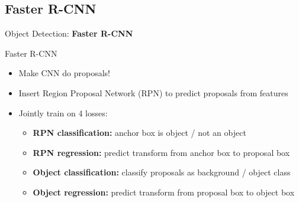 \subsection{Faster R-CNN}
\begin{frame}{}
    \LARGE Object Detection: \textbf{Faster R-CNN}
\end{frame}

\begin{frame}{Faster R-CNN}
    \begin{itemize}
        \item Make CNN do proposals!
        \item Insert Region Proposal Network (RPN) to predict proposals from features
        \pause
        \item Jointly train on 4 losses:
        \begin{itemize}
            \item \textbf{RPN classification:} anchor box is object / not an object
            \item \textbf{RPN regression:} predict transform from anchor box to proposal box
            \item \textbf{Object classification:} classify proposals as background / object class
            \item \textbf{Object regression:} predict transform from proposal box to object box
        \end{itemize}
    \end{itemize}
    
\end{frame}

